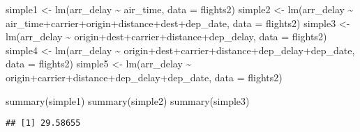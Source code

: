 \documentclass[
]{article}
\newenvironment{Shaded}{\begin{snugshade}}{\end{snugshade}}
\newcommand{\AttributeTok}[1]{\textcolor[rgb]{0.77,0.63,0.00}{#1}}
\newcommand{\FunctionTok}[1]{\textcolor[rgb]{0.00,0.00,0.00}{#1}}
\newcommand{\NormalTok}[1]{#1}
\newcommand{\OtherTok}[1]{\textcolor[rgb]{0.56,0.35,0.01}{#1}}
\newcommand{\SpecialCharTok}[1]{\textcolor[rgb]{0.00,0.00,0.00}{#1}}
\begin{document}
\begin{Shaded}
\begin{Highlighting}[]
\NormalTok{simple1 }\OtherTok{\textless{}{-}} \FunctionTok{lm}\NormalTok{(arr\_delay }\SpecialCharTok{\textasciitilde{}}\NormalTok{ air\_time, }\AttributeTok{data =}\NormalTok{ flights2)}
\NormalTok{simple2 }\OtherTok{\textless{}{-}} \FunctionTok{lm}\NormalTok{(arr\_delay }\SpecialCharTok{\textasciitilde{}}\NormalTok{ air\_time}\SpecialCharTok{+}\NormalTok{carrier}\SpecialCharTok{+}\NormalTok{origin}\SpecialCharTok{+}\NormalTok{distance}\SpecialCharTok{+}\NormalTok{dest}\SpecialCharTok{+}\NormalTok{dep\_date, }\AttributeTok{data =}\NormalTok{ flights2)}
\NormalTok{simple3 }\OtherTok{\textless{}{-}} \FunctionTok{lm}\NormalTok{(arr\_delay }\SpecialCharTok{\textasciitilde{}}\NormalTok{ origin}\SpecialCharTok{+}\NormalTok{dest}\SpecialCharTok{+}\NormalTok{carrier}\SpecialCharTok{+}\NormalTok{distance}\SpecialCharTok{+}\NormalTok{dep\_delay, }\AttributeTok{data =}\NormalTok{ flights2)}
\NormalTok{simple4 }\OtherTok{\textless{}{-}} \FunctionTok{lm}\NormalTok{(arr\_delay }\SpecialCharTok{\textasciitilde{}}\NormalTok{ origin}\SpecialCharTok{+}\NormalTok{dest}\SpecialCharTok{+}\NormalTok{carrier}\SpecialCharTok{+}\NormalTok{distance}\SpecialCharTok{+}\NormalTok{dep\_delay}\SpecialCharTok{+}\NormalTok{dep\_date, }\AttributeTok{data =}\NormalTok{ flights2)}
\NormalTok{simple5 }\OtherTok{\textless{}{-}} \FunctionTok{lm}\NormalTok{(arr\_delay }\SpecialCharTok{\textasciitilde{}}\NormalTok{ origin}\SpecialCharTok{+}\NormalTok{carrier}\SpecialCharTok{+}\NormalTok{distance}\SpecialCharTok{+}\NormalTok{dep\_delay}\SpecialCharTok{+}\NormalTok{dep\_date, }\AttributeTok{data =}\NormalTok{ flights2)}


\FunctionTok{summary}\NormalTok{(simple1)}
\FunctionTok{summary}\NormalTok{(simple2)}
\FunctionTok{summary}\NormalTok{(simple3)}
\end{Highlighting}
\end{Shaded}

\begin{Shaded}
\end{Shaded}

\begin{verbatim}
## [1] 29.58655
\end{verbatim}
\end{document}
